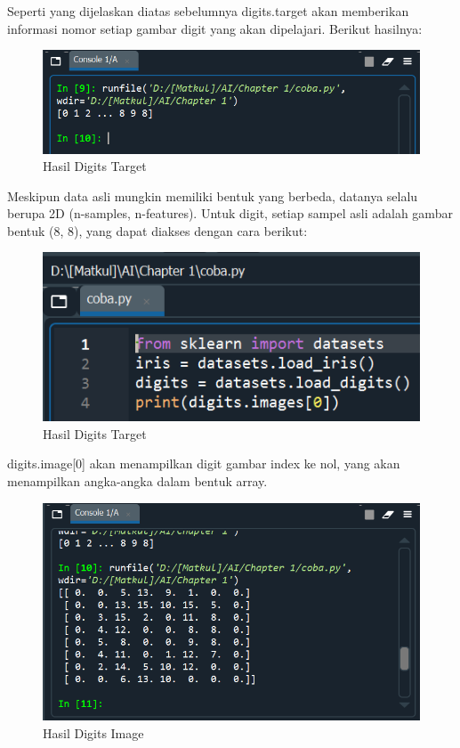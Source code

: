 \par Seperti yang dijelaskan diatas sebelumnya digits.target akan memberikan informasi nomor setiap gambar digit yang akan dipelajari. Berikut hasilnya:
    \begin{figure}[H]
    \centering
    \includegraphics[width=13cm]{figures/chapter1/7.PNG}
    \caption{Hasil Digits Target}
    \end{figure}

\par Meskipun data asli mungkin memiliki bentuk yang berbeda, datanya selalu berupa 2D (n-samples, n-features). Untuk digit, setiap sampel asli adalah gambar bentuk (8, 8), yang dapat diakses dengan cara berikut:
    \begin{figure}[H]
    \centering
    \includegraphics[width=13cm]{figures/chapter1/8.PNG}
    \caption{Hasil Digits Target}
    \end{figure}

\par digits.image[0] akan menampilkan digit gambar index ke nol, yang akan menampilkan angka-angka dalam bentuk array.
    \begin{figure}[H]
    \centering
    \includegraphics[width=13cm]{figures/chapter1/9.PNG}
    \caption{Hasil Digits Image}
    \end{figure}

